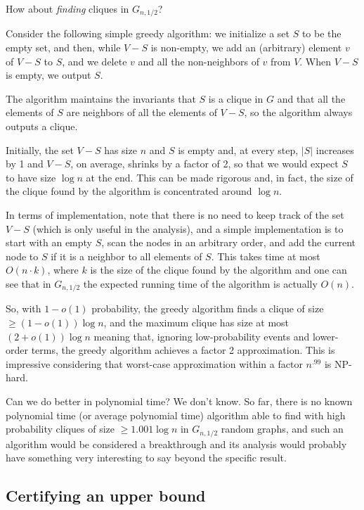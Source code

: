  How about {\em finding} cliques in $G_{n,1/2}$? 
 
Consider the following simple greedy algorithm: we initialize a set $S$ to be the empty set, and then, while $V-S$ is non-empty, we add an (arbitrary) element $v$ of $V-S$ to $S$, and we delete $v$ and all the non-neighbors of $v$ from $V$. When $V-S$ is empty, we output $S$.

The algorithm maintains the invariants that $S$ is a clique in $G$ and that all the elements of $S$ are neighbors of all the elements of $V-S$, so the algorithm always outputs a clique. 

Initially, the set $V-S$ has size $n$ and $S$ is empty and, at every step, $|S|$ increases by 1 and $V-S$, on average, shrinks by a factor of 2, so that we would expect $S$ to have size $\log n$ at the end. This can be made rigorous and, in fact, the size of the clique found by the algorithm is concentrated around $\log n$.

In terms of implementation, note that there is no need to keep track of the set $V-S$ (which is only useful in the analysis), and a simple implementation is to start with an empty $S$, scan the nodes in an arbitrary order, and add the current node to $S$ if it is a neighbor to all elements of $S$. This takes time at most $O(n \cdot k)$, where $k$ is the size of the clique found by the algorithm and one can see that in $G_{n,1/2}$ the expected running time of the algorithm is actually $O(n)$.

So, with $1-o(1)$ probability, the greedy algorithm finds a clique of size $\geq (1-o(1)) \log n$, and the maximum clique has size at most $(2+o(1)) \log n$ meaning that, ignoring low-probability events and lower-order terms, the greedy algorithm achieves a factor 2 approximation. This is impressive considering that worst-case approximation within a factor $n^{.99}$ is NP-hard.

Can we do better in polynomial time? We don't know. So far, there is no known polynomial time (or average polynomial time) algorithm able
to find with high probability cliques of size $\geq 1.001 \log n$ in $G_{n,1/2}$ random graphs, and such an algorithm would be
considered a breakthrough and its analysis would probably have something very interesting to say beyond the specific result.

\subsection{Certifying an upper bound}

